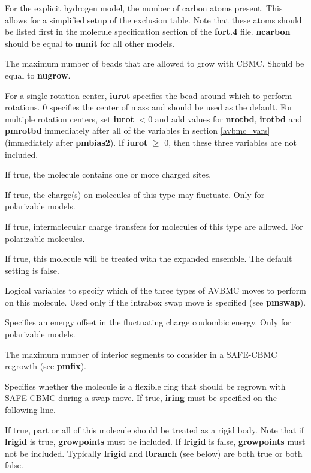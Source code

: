\documentclass[12pt,letterpaper]{article}
\begin{document}
 For the explicit hydrogen model, the number of
carbon atoms present.  This allows for a simplified setup of the exclusion table.  
Note that these atoms should be listed first in the molecule specification section 
of the {\textbf{fort.4}} file.  
{\textbf{ncarbon}} should be equal to {\textbf{nunit}} for all other models.

 The maximum number of beads that are allowed to grow
with CBMC.  Should be equal to {\textbf {nugrow}}.

 For a single rotation center, {\bf iurot} specifies the bead around which to perform rotations.
0 specifies the center of mass and should be used as the default.
For multiple rotation centers, set {\bf iurot} $< 0$ and add values for \textbf {nrotbd}, \textbf {irotbd} and \textbf {pmrotbd}
immediately after all of the variables in section \ref{avbmc_vars} (immediately after {\bf pmbias2}).
If {\bf iurot} $\ge$ 0, then these three variables are not included. 

 If true, the molecule contains one or more charged sites.

 If true, the charge(s) on molecules of this type may fluctuate.
Only for polarizable models.

 If true, intermolecular charge transfers 
for molecules of this type are allowed.
For polarizable molecules.

 If true, this molecule will be treated with the expanded ensemble.
The default setting is false.

 Logical variables to specify which of the three types
of AVBMC moves to perform on this molecule.
Used only if the intrabox swap move is specified (see {\textbf{pmswap}}).

 Specifies an energy offset in the fluctuating
charge coulombic energy.  Only for polarizable models.

 The maximum number of interior segments to consider
in a SAFE-CBMC regrowth (see {\textbf {pmfix}}).

 Specifies whether the molecule is a flexible ring
that should be regrown with SAFE-CBMC during a swap move.  If true,
{\textbf {iring}} must be specified on the following line.

 If true, part or all of this molecule should be treated as a rigid body.
Note that if {\textbf{lrigid}} is true, {\textbf{growpoints}} must be included.  
If {\textbf{lrigid}} is false, {\textbf{growpoints}} must not be included.
Typically {\textbf{lrigid}} and {\textbf{lbranch}} (see below) are both true or both false.
\end{document}
